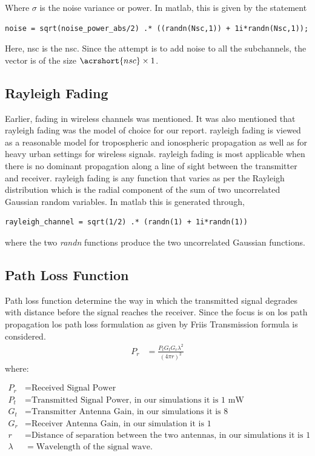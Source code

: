 Where $\sigma$ is the noise variance or power. In \gls{matlab}, this is given by the statement
\begin{verbatim}
noise = sqrt(noise_power_abs/2) .* ((randn(Nsc,1)) + 1i*randn(Nsc,1));
\end{verbatim}
Here, \acrshort{nsc} is the \acrlong{nsc}. Since the attempt is to add noise to all the subchannels, the vector is of the size $\acrshort{nsc} \times 1$.

\subsection{Rayleigh Fading}
Earlier, fading in wireless channels was mentioned. It was also mentioned that \gls{rayleigh fading} was the model of choice for our report. \gls{rayleigh fading} is viewed as a reasonable model for tropospheric and ionospheric propagation as well as for heavy urban settings for wireless signals. \gls{rayleigh fading} is most applicable when there is no dominant propagation along a line of sight between the transmitter and receiver. \gls{rayleigh fading} is any function that varies as per the Rayleigh distribution which is the radial component of the sum of two uncorrelated Gaussian random variables. In \gls{matlab} this is generated through,
\begin{verbatim}
rayleigh_channel = sqrt(1/2) .* (randn(1) + 1i*randn(1))
\end{verbatim}
where the two \emph{randn} functions produce the two uncorrelated Gaussian functions.

\subsection{Path Loss Function}
Path loss function determine the way in which the transmitted signal degrades with distance before the signal reaches the receiver. Since the focus is on \acrlong{los} path propagation \acrshort{los} path loss formulation as given by Friis Transmission formula is considered.
\begin{align}
P_r &= \frac{P_t G_t G_r \lambda^2}{(4 \pi r)^2} 
\end{align}
where:

\begin{align*}
P_r &= \text{Received Signal Power}\\
P_t &= \text{Transmitted Signal Power, in our simulations it is 1 mW}\\
G_t &= \text{Transmitter Antenna Gain, in our simulations it is 8}\\
G_r &= \text{Receiver Antenna Gain, in our simulation it is 1}\\
r &= \text{Distance of separation between the two antennas, in our simulations it is 1 Km}\\
\lambda &= \text{Wavelength of the signal wave}.\\
\end{align*}


